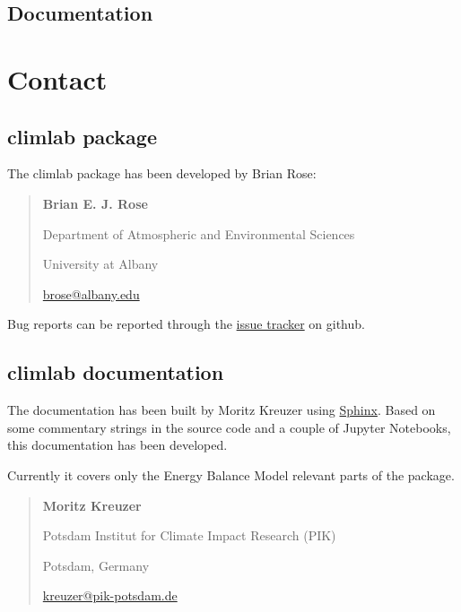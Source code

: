 \documentclass[a4paper,10pt,english]{sphinxmanual}
\begin{document}
\section{Documentation}
\label{license:documentation}

\chapter{Contact}
\label{contact:contact}\label{contact::doc}

\section{climlab package}
\label{contact:climlab-package}
The climlab package has been developed by Brian Rose:
\begin{quote}

\begin{DUlineblock}{0em}
\item[] \textbf{Brian E. J. Rose}
\item[] Department of Atmospheric and Environmental Sciences
\item[] University at Albany
\item[] \href{mailto:brose@albany.edu}{brose@albany.edu}
\end{DUlineblock}
\end{quote}

Bug reports can be reported through the \href{https://github.com/brian-rose/climlab/issues}{issue tracker} on github.


\section{climlab documentation}
\label{contact:climlab-documentation}
The documentation has been built by Moritz Kreuzer using \href{http://www.sphinx-doc.org}{Sphinx}.
Based on some commentary strings in the source code and a couple of Jupyter Notebooks, this documentation has been developed.

Currently it covers only the Energy Balance Model relevant parts of the package.
\begin{quote}

\begin{DUlineblock}{0em}
\item[] \textbf{Moritz Kreuzer}
\item[] Potsdam Institut for Climate Impact Research (PIK)
\item[] Potsdam, Germany
\item[] \href{mailto:kreuzer@pik-potsdam.de}{kreuzer@pik-potsdam.de}
\end{DUlineblock}
\end{quote}
\end{document}
